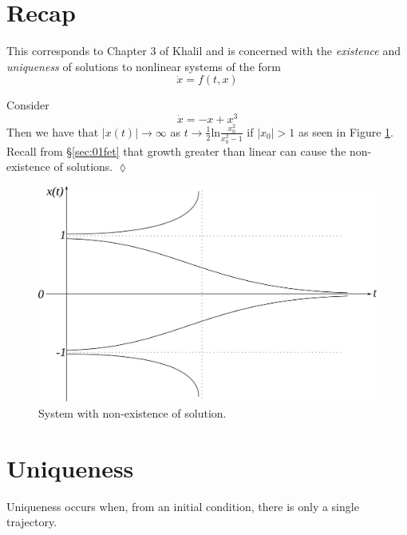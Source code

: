 
\mainmatter
\setcounter{page}{1}

\lectureseries[\course]{\course}

\date{January 14, 2010}

\setaddress

\setcounter{lecture}{3}
\setcounter{chapter}{3}


\section{Recap}
This corresponds to Chapter 3 of Khalil and is concerned with the \textit{existence} and \textit{uniqueness} of solutions to nonlinear systems of the form
$$\dot{x} = f(t,x)$$

\begin{example}
Consider
$$\dot{x} = -x + x^3$$
Then we have that $|x(t)|\to\infty$ as $t\to\tfrac{1}{2}\text{ln}\frac{x_0^2}{x_0^2-1}$ if $|x_0|>1$ as seen in Figure \ref{fig:04nonexist}. Recall from \S\ref{sec:01fet} that growth greater than linear can cause the non-existence of solutions.
$\lozenge$
\end{example}

\begin{figure}[ht!]
	\centering
	\includegraphics[width=.5\textwidth]{images/04nonexist}
	\caption{System with non-existence of solution.}
	\label{fig:04nonexist}
\end{figure}

\section{Uniqueness}
Uniqueness occurs when, from an initial condition, there is only a single trajectory.

